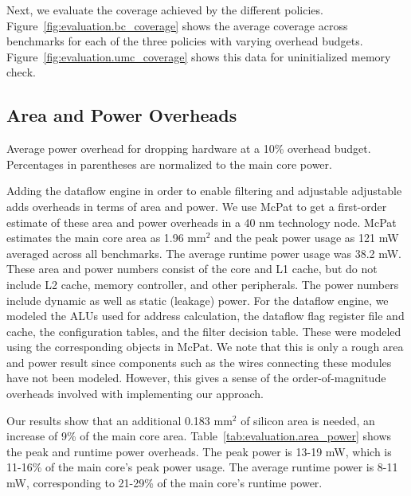 Next, we evaluate the coverage achieved by the different policies.
Figure~\ref{fig:evaluation.bc_coverage} shows the average coverage across
benchmarks for each of the three policies with varying overhead budgets.
Figure~\ref{fig:evaluation.umc_coverage} shows this data for uninitialized
memory check.

\subsection{Area and Power Overheads}

\begin{table}[tb]
  \begin{center}
    \vspace{-0.0in}
    \begin{footnotesize}
    
    \end{footnotesize}
    \caption{Average power overhead for dropping hardware at a 10\% overhead
    budget. Percentages in parentheses are normalized to the main core
    power.}
    \vspace{-0.2in}
    \label{tab:evaluation.area_power}
  \end{center}
\end{table}

Adding the dataflow engine in order to enable filtering and adjustable adjustable adds
overheads in terms of area and power. We use McPat \cite{mcpat-micro09} to get
a first-order estimate of these area and power overheads in a 40 nm technology
node. McPat estimates the main core area as 1.96 mm$^2$ and the peak power usage as
121 mW averaged across all benchmarks. The average runtime power usage was 38.2 
mW. These area and power numbers consist of the core and
L1 cache, but do not include L2 cache, memory controller, and other
peripherals. The power numbers include dynamic as well as static (leakage)
power. For the dataflow engine, we modeled the ALUs used for address
calculation, the dataflow flag register file and cache, the configuration
tables, and the filter decision table. These were modeled using the
corresponding objects in McPat. We
note that this is only a rough area and power result since components such as the
wires connecting these modules have not been modeled. However, this gives a
sense of the order-of-magnitude overheads involved with implementing our
approach.

Our results show that an additional 0.183 mm$^2$ of silicon area is needed, an
increase of 9\% of the main core area. Table~\ref{tab:evaluation.area_power}
shows the peak and runtime power overheads. The peak power is 13-19 mW, which is
11-16\% of the main core's peak power usage. The average runtime power is 8-11
mW, corresponding to 21-29\% of the main core's runtime power.

